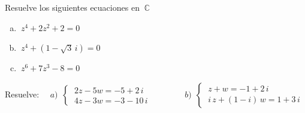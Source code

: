 \begin{mipropuesto}

Resuelve los siguientes ecuaciones en $\ \mathbb C$

\begin{multicols}{3}
\begin{enumerate}[a) ]
	\item $\ z^4+2z^2+2=0$
	\item $\ z^4+(1-\sqrt{3}\, i)=0$
	\item $\ z^6+7z^3-8=0$
\end{enumerate}	
\end{multicols}

\end{mipropuesto}

\vspace{-8mm}
\begin{flushright}
\begin{footnotesize} \textcolor{gris}{}	\end{footnotesize}
\end{flushright}


\begin{mipropuesto}

Resuelve: $\quad a)\ \ \begin{cases} \ 2z-5w=-5+2\, i \\ \ 4z-3w=-3-10\, i \end{cases} \qquad \qquad b)\ \ \begin{cases} \ z+w=-1+2\, i \\ \ i\, z+(1-i)\, w = 1+3\, i \end{cases}$
\end{mipropuesto}

\vspace{-8mm}
\begin{flushright}
\begin{footnotesize} \textcolor{gris}{}	\end{footnotesize}
\end{flushright}


\vspace{1cm}

